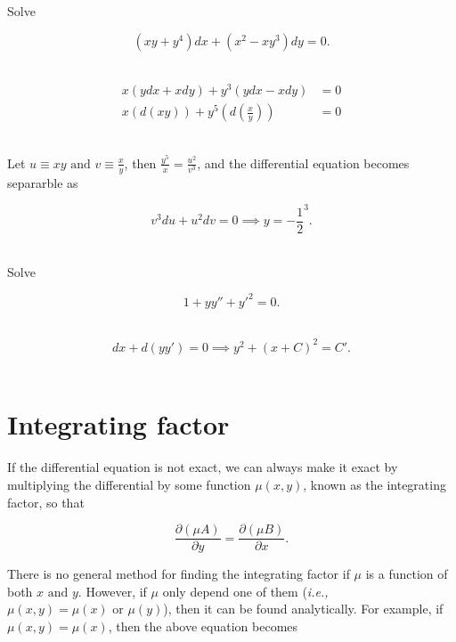 \documentclass[english,a4paper,12pt]{report}
\begin{document}
{Solve 

\begin{equation}
    (xy+y^4)dx + (x^2- xy^3 )dy = 0.
\end{equation}~
}
{\begin{equation}
    \begin{aligned} 
        x(ydx+xdy)+y^3 (ydx-xdy) &= 0\\
        x(d(xy))+y^{5}\left(d\left( \frac{x}{y}  \right)\right) &=0 
    \end{aligned}  
\end{equation}~

Let \(u \equiv xy \text { and } v \equiv \frac{x}{y} \), then \(\frac{y^{5} }{x} = \frac{u^2}{v^3 }    \), and the differential equation becomes separarble as

\begin{equation}
    v^3 du+u^2dv = 0 \implies y = -\frac{1}{2}^3 . 
\end{equation}~
} 

{Solve 

\begin{equation}
    1+ y y'' + y'^2 = 0.
\end{equation}~
}
{\begin{equation}
    dx+d(y y') = 0 \implies y^2+(x+C)^2=C'.
\end{equation}~
} 






\section{Integrating factor}

If the differential equation is not exact, we can always make it exact by multiplying the differential by some function \(\mu (x,y)\), known as the integrating factor, so that

\begin{equation}
    \frac{\partial (\mu A)}{\partial y} = \frac{\partial (\mu B)}{\partial x}.  
\end{equation}

There is no general method for finding the integrating factor if \(\mu \) is a function of both \(x \text { and } y\). However, if \(\mu \) only depend one of them (\textit{i.e.,} \(\mu (x,y) = \mu (x) \text { or } \mu (y)\)), then it can be found analytically. For example, if \(\mu (x,y) = \mu (x)\), then the above equation becomes
\end{document}

